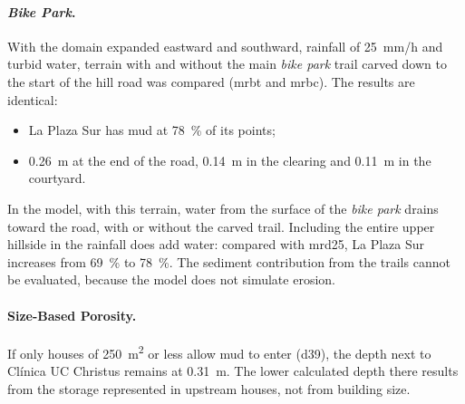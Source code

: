 \paragraph{\emph{Bike Park}.} With the domain expanded eastward and southward, rainfall of \SI{25}{mm/h} and turbid water, terrain with and without the main \emph{bike park} trail carved down to the start of the hill road was compared (mrbt and mrbc). The results are identical:
\begin{itemize}
\item La Plaza Sur has mud at \SI{78}{\percent} of its points;
\item \SI{0.26}{m} at the end of the road, \SI{0.14}{m} in the clearing and \SI{0.11}{m} in the courtyard.
\end{itemize}
In the model, with this terrain, water from the surface of the \emph{bike park} drains toward the road, with or without the carved trail. Including the entire upper hillside in the rainfall does add water: compared with mrd25, La Plaza Sur increases from \SI{69}{\percent} to \SI{78}{\percent}. The sediment contribution from the trails cannot be evaluated, because the model does not simulate erosion.

\paragraph{Size-Based Porosity.} If only houses of \SI{250}{m^2} or less allow mud to enter (d39), the depth next to Clínica UC Christus remains at \SI{0.31}{m}. The lower calculated depth there results from the storage represented in upstream houses, not from building size.

